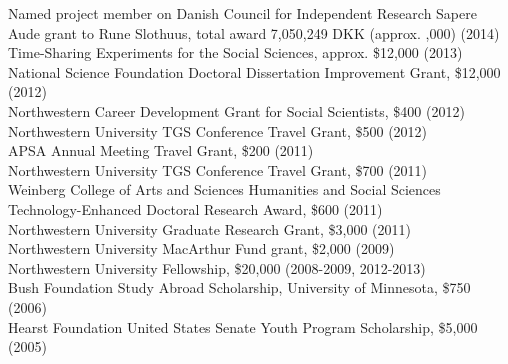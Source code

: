 \documentclass[12pt]{article}
\renewcommand{\section}[1]{\pagebreak[3]%
    \llap{\scshape\smash{\parbox[t]{\marginparwidth}{\raggedright {\color{lg}#1}}}}%
    \vspace{-\baselineskip}\par}
\newcommand{\topic}[1]{\pagebreak[3]\indent {\color{lg}{\footnotesize #1 }}\\}
\newcommand{\entry}[1]{\indent {\color{lg}\guillemotright}\hspace{2pt}#1\vspace{.25em}\\}
\begin{document}


\section{Grants\\and\\Funding}
\entry{Named project member on Danish Council for Independent Research Sapere Aude grant to Rune Slothuus, total award 7,050,249 DKK (approx. \textsterling 690,000) (2014)}
\entry{Time-Sharing Experiments for the Social Sciences, approx. \$12,000 (2013)}
\entry{National Science Foundation Doctoral Dissertation Improvement Grant, \$12,000 (2012)}
\entry{Northwestern Career Development Grant for Social Scientists, \$400 (2012)}
\entry{Northwestern University TGS Conference Travel Grant, \$500 (2012)}
\entry{APSA Annual Meeting Travel Grant, \$200 (2011)}
\entry{Northwestern University TGS Conference Travel Grant, \$700 (2011)}
\entry{Weinberg College of Arts and Sciences Humanities and Social Sciences Technology-Enhanced Doctoral Research Award, \$600 (2011)}
\entry{Northwestern University Graduate Research Grant, \$3,000 (2011)}
\entry{Northwestern University MacArthur Fund grant, \$2,000 (2009)}
\entry{Northwestern University Fellowship, \$20,000 (2008-2009, 2012-2013)}
\entry{Bush Foundation Study Abroad Scholarship, University of Minnesota, \$750 (2006)}
\entry{Hearst Foundation United States Senate Youth Program Scholarship, \$5,000 (2005)}
\end{document}
